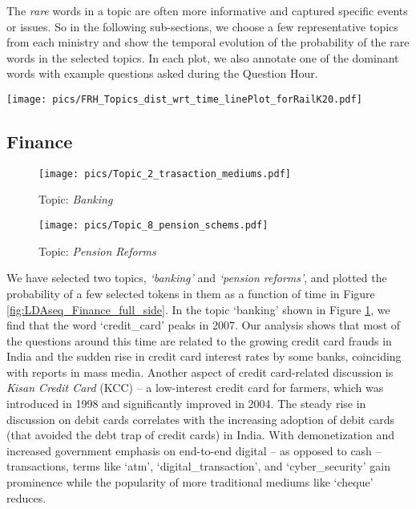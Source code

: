\documentclass[10pt, a4paper]{article}
\begin{document}
The \textit{rare} words in a topic are often more informative and captured specific events or issues. So in the following sub-sections, we choose a few representative topics from each ministry and show the temporal evolution of the probability of the rare words in the selected topics. In each plot, we also annotate one of the dominant words with example questions asked during the Question Hour.

\begin{figure*} [!htbp]
        \centering
        \texttt{[image: pics/FRH\_Topics\_dist\_wrt\_time\_linePlot\_forRailK20.pdf]}
        \caption{Temporal evolution of topics in 3 subsets of TCPD-IPD using LDAseq.} 
        \label{fig:LDAseq_Finance_full_line}
\end{figure*}

\subsection{Finance}
\label{sec:finance}
\begin{figure*}[!htbp]
    \centering 
    \begin{subfigure}[b]{0.49\textwidth}
        \texttt{[image: pics/Topic\_2\_trasaction\_mediums.pdf]}
        \caption{Topic: \textit{Banking}}
        \label{fig:LDAseq_Finance_full_T2}
    \end{subfigure} \hfill
    \begin{subfigure}[b]{0.49\textwidth}
        \texttt{[image: pics/Topic\_8\_pension\_schems.pdf]}
        \caption{Topic: \textit{Pension Reforms}}
        \label{fig:LDAseq_Finance_full_T8}
    \end{subfigure}
    \caption{Selected topics obtained by running LDAseq on the Finance subset of TCPD-IPD.}
    \label{fig:LDAseq_Finance_full_side}
\end{figure*}
We have selected two topics, \textit{`banking'} and \textit{`pension reforms'}, and plotted the probability of a few selected tokens in them as a function of time in Figure  \ref{fig:LDAseq_Finance_full_side}. 
In the topic `banking' shown in Figure \ref{fig:LDAseq_Finance_full_T2}, we find that the word `credit\_card' peaks in 2007. Our analysis shows that most of the questions around this time are related to the growing credit card frauds in India and the sudden rise in credit card interest rates by some banks, coinciding with reports in mass media. Another aspect of credit card-related discussion is \textit{Kisan Credit Card} (KCC) -- a low-interest credit card for farmers, which was introduced in 1998 and significantly improved in 2004.
The steady rise in discussion on debit cards correlates with the increasing adoption of debit cards (that avoided the debt trap of credit cards) in India. With demonetization and increased government emphasis on end-to-end digital -- as opposed to cash --  transactions, terms like `atm', `digital\_transaction', and `cyber\_security' gain prominence while the popularity of more traditional mediums like `cheque' reduces.
\end{document}
